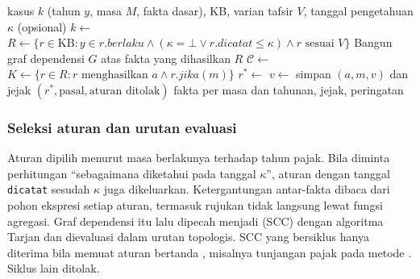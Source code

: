 \begin{algorithm}[t]
\caption{Evaluasi satu pegawai untuk satu tahun pajak}
\label{alg:engine}
\footnotesize
\begin{algorithmic}[1]
\Require kasus $k$ (tahun $y$, masa $M$, fakta dasar), KB, varian tafsir $V$, tanggal pengetahuan $\kappa$ (opsional)
\State $k \gets$  
\State {} 
\State $R \gets \{r \in \mathrm{KB} : y \in r.\mathit{berlaku} \wedge (\kappa = \bot \vee r.\mathit{dicatat} \le \kappa) \wedge r \text{ sesuai } V\}$
\State Bangun graf dependensi $G$ atas fakta yang dihasilkan $R$
\State $\mathcal{C} \gets$  
    \State {} 
  \Else
      \State $K \gets \{r \in R : r \text{ menghasilkan } a \wedge r.\mathit{jika}(m)\}$
      \State $r^{*} \gets$  
      \State $v \gets$ 
      \State simpan $(a, m, v)$ dan jejak $(r^{*}, \text{pasal}, \text{aturan ditolak})$
    \EndFor
  \EndIf
\EndFor
\State \Return fakta per masa dan tahunan, jejak, peringatan
\end{algorithmic}
\end{algorithm}

\subsubsection{Seleksi aturan dan urutan evaluasi}
Aturan dipilih menurut masa berlakunya terhadap tahun pajak. Bila diminta perhitungan ``sebagaimana diketahui pada tanggal $\kappa$'', aturan dengan tanggal \texttt{dicatat} sesudah $\kappa$ juga dikeluarkan. Ketergantungan antar-fakta dibaca dari pohon ekspresi setiap aturan, termasuk rujukan tidak langsung lewat fungsi agregasi. Graf dependensi itu lalu dipecah menjadi  (SCC) dengan algoritma Tarjan dan dievaluasi dalam urutan topologis. SCC yang bersiklus hanya diterima bila memuat aturan bertanda , misalnya tunjangan pajak pada metode . Siklus lain ditolak.

